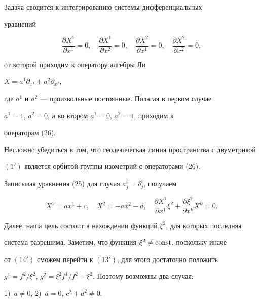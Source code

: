 \begin{pf}


Задача сводится к интегрированию системы дифференциальных


уравнений


$$


\frac{\partial X^1}{\partial x^1}=0,\quad


\frac{\partial X^1}{\partial x^2}=0,\quad


\frac{\partial X^2}{\partial x^1}=0,\quad


\frac{\partial X^2}{\partial x^2}=0,


$$


от которой приходим к оператору алгебры Ли


$X=a^1\partial_{x^1}+a^2\partial_{x^2}$,


где $a^1$ и $a^2$ --- произвольные постоянные. Полагая в первом случае


$a^1=1$, $a^2=0$, а во втором $a^1=0$, $a^2=1$, приходим к


операторам (26).


\end{pf}





Несложно убедиться в том, что геодезическая линия пространства с двуметрикой


$(1')$ является орбитой группы изометрий с операторами (26).





Записывая уравнения (25) для случая $a^i_j=\delta^i_j$, получаем


$$


X^1=ax^1+c,\quad


X^2=-ax^2 - d,\quad


\frac{\partial X^1}{\partial x^1}\xi ^2+\frac{\partial \xi ^2}{\partial x^k}%


X^k=0.


$$


Далее, наша цель состоит в нахождении функций $\xi^2$, для которых последняя


система разрешима. Заметим, что функция $\xi^2 \neq \operatorname{const}$, поскольку иначе


от $(14')$ сможем перейти к $(13')$, для этого достаточно положить


$g^1=f^2/\xi^2$, $g^2=\xi^2f^1/f^2 - \xi^2$. Поэтому возможны два случая:


1)~$a\neq 0$, 2)~$a=0$, $c^2+d^2\neq0$.





